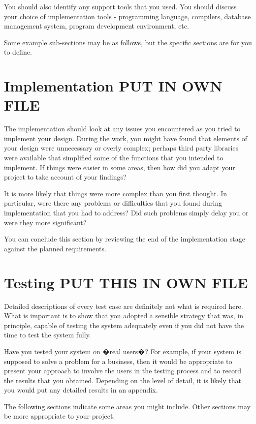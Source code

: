 You should also identify any support tools that you used. You should discuss your choice of implementation tools - programming language, compilers, database management system, program development environment, etc.

Some example sub-sections may be as follows, but the specific sections are for you to define. 

\chapter{Implementation PUT IN OWN FILE}

The implementation should look at any issues you encountered as you tried to implement your design. During the work, you might have found that elements of your design were unnecessary or overly complex; perhaps third party libraries were available that simplified some of the functions that you intended to implement. If things were easier in some areas, then how did you adapt your project to take account of your findings?

It is more likely that things were more complex than you first thought. In particular, were there any problems or difficulties that you found during implementation that you had to address? Did such problems simply delay you or were they more significant? 

You can conclude this section by reviewing the end of the implementation stage against the planned requirements. 

\chapter{Testing PUT THIS IN OWN FILE}

Detailed descriptions of every test case are definitely not what is required here. What is important is to show that you adopted a sensible strategy that was, in principle, capable of testing the system adequately even if you did not have the time to test the system fully.

Have you tested your system on �real users�? For example, if your system is supposed to solve a problem for a business, then it would be appropriate to present your approach to involve the users in the testing process and to record the results that you obtained. Depending on the level of detail, it is likely that you would put any detailed results in an appendix.

The following sections indicate some areas you might include. Other sections may be more appropriate to your project. 

